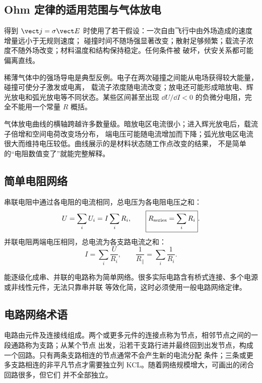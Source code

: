 \subsection*{Ohm 定律的适用范围与气体放电}

得到 $\vect j=\sigma\vect E$ 时使用了若干假设：一次自由飞行中由外场造成的速度增量远小于无规则速度；
碰撞时间不随场强显著改变；散射足够频繁；载流子浓度不随外场改变；材料温度和结构保持稳定。任何条件被
破坏，伏安关系都可能偏离直线。

稀薄气体中的强场导电是典型反例。电子在两次碰撞之间能从电场获得较大能量，碰撞可使分子激发或电离，
载流子浓度随电流改变；放电还可能形成暗放电、辉光放电和弧光放电等不同状态。某些区间甚至出现
$\dd U/\dd I<0$ 的负微分电阻，完全不能用一个常量 $R$ 概括。

\gasDischargeContextDiagram

气体放电曲线的横轴跨越许多数量级。暗放电区电流很小；进入辉光放电后，载流子倍增和空间电荷改变场分布，
端电压可能随电流增加而下降；弧光放电区电流很大而维持电压较低。曲线展示的是材料状态随工作点改变的结果，
不是简单的“电阻数值变了”就能完整解释。

\subsection*{简单电阻网络}

串联电阻中通过各电阻的电流相同，总电压为各电阻电压之和：
\begin{equation}
  U=\sum_iU_i=I\sum_iR_i,
  \qquad
  \boxed{R_{\rm series}=\sum_iR_i}.
\end{equation}
并联电阻两端电压相同，总电流为各支路电流之和：
\begin{equation}
  I=\sum_i\frac U{R_i},
  \qquad
  \boxed{\frac1{R_{\parallel}}=\sum_i\frac1{R_i}}.
\end{equation}

\resistorConnectionDiagram

能逐级化成串、并联的电路称为简单网络。很多实际电路含有桥式连接、多个电源或非线性元件，无法只靠串并联
等效化简，这时必须使用一般电路网络定律。

\subsection*{电路网络术语}

电路由元件及连接线组成。两个或更多元件的连接点称为节点，相邻节点之间的一段通路称为支路；从某个节点
出发，沿若干支路行进并最终回到出发节点，构成一个回路。只有两条支路相连的节点通常不会产生新的电流分配
条件；三条或更多支路相连的非平凡节点才需要独立列 KCL。随着网络规模增大，可画出的闭合回路很多，但它们
并不全部独立。

